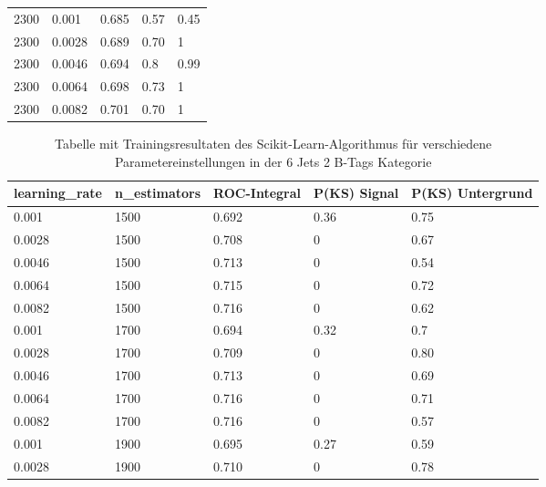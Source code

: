 \begin{table}[tbp]
\begin{center}
\begin{tabular}{lllll}
\num{2300} & \num{0.001}  & \num{0,685} & \num{0,57} & \num{0,45}\\
\num{2300} & \num{0.0028} & \num{0,689} & \num{0,70} & \num{1}\\
\num{2300} & \num{0.0046} & \num{0,694} & \num{0,8}  & \num{0,99}\\
\num{2300} & \num{0.0064} & \num{0,698} & \num{0,73} & \num{1}\\
\num{2300} & \num{0.0082} & \num{0,701} & \num{0,70} & \num{1}\\
  \hline
  \end{tabular}
  \end{center}
\end{table}

\begin{table}[tbp]\parbox{12cm}{
  \caption[Scikit-Learn 6j2t Ergebnisse]{Tabelle mit Trainingsresultaten des Scikit-Learn-Algorithmus f\"ur verschiedene Parametereinstellungen in der 6 Jets 2 B-Tags Kategorie}%
  }\label{tab:sklearn_6j2t}
  \begin{center}
  \begin{tabular}{lllll}
  \hline
  learning\_rate & n\_estimators & ROC-Integral & P(KS) Signal & P(KS) Untergrund\\
  \hline
\num{0,001}  & \num{1500} & \num{0,692} & \num{0,36} & \num{0,75}\\
\num{0,0028} & \num{1500} & \num{0,708} & \num{0}    & \num{0,67}\\
\num{0,0046} & \num{1500} & \num{0,713} & \num{0}    & \num{0,54}\\
\num{0,0064} & \num{1500} & \num{0,715} & \num{0}    & \num{0,72}\\
\num{0,0082} & \num{1500} & \num{0,716} & \num{0}    & \num{0,62}\\
\num{0,001}  & \num{1700} & \num{0,694} & \num{0,32} & \num{0,7}\\
\num{0,0028} & \num{1700} & \num{0,709} & \num{0}    & \num{0,80}\\
\num{0,0046} & \num{1700} & \num{0,713} & \num{0}    & \num{0,69}\\
\num{0,0064} & \num{1700} & \num{0,716} & \num{0}    & \num{0,71}\\
\num{0,0082} & \num{1700} & \num{0,716} & \num{0}    & \num{0,57}\\
\num{0,001}  & \num{1900} & \num{0,695} & \num{0,27} & \num{0,59}\\
\num{0,0028} & \num{1900} & \num{0,710} & \num{0}    & \num{0,78}\\

\end{tabular}
\end{center}
\end{table}
